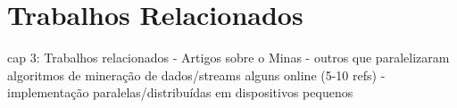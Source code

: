 \chapter{Trabalhos Relacionados}

cap 3: Trabalhos relacionados
    - Artigos sobre o Minas
    - outros que paralelizaram algoritmos de mineração de dados/streams alguns online (5-10 refs)
    - implementação paralelas/distribuídas em dispositivos pequenos
% 







